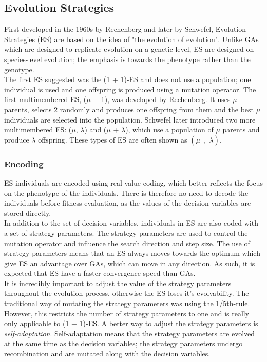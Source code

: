 \subsection{Evolution Strategies}
First developed in the 1960s by Rechenberg and later by Schwefel, Evolution Strategies (ES) are based on the idea of "the evolution of evolution"\cite{4-es}. Unlike GAs which are designed to replicate evolution on a genetic level, ES are designed on species-level evolution; the emphasis is towards the phenotype rather than the genotype.
\\The first ES suggested was the (1 + 1)-ES and does not use a population; one individual is used and one offspring is produced using a mutation operator\cite{4-es, es}. The first multimembered ES, ($\mu$ + 1), was developed by Rechenberg. It uses $\mu$ parents, selects 2 randomly and produces one offspring from them and the best $\mu$ individuals are selected into the population\cite{4-es, es}. Schwefel later introduced two more multimembered ES: ($\mu$, $\lambda$) and ($\mu$ + $\lambda$)\cite{es}, which use a population of $\mu$ parents and produce $\lambda$ offspring. These types of ES are often shown as $(\mu\;\overset{+}{,}\;\lambda)$.

\subsubsection{Encoding}
ES individuals are encoded using real value coding, which better reflects the focus on the phenotype of the individuals. There is therefore no need to decode the individuals before fitness evaluation, as the values of the decision variables are stored directly.
\\In addition to the set of decision variables, individuals in ES are also coded with a set of strategy parameters. The strategy parameters are used to control the mutation operator and influence the search direction and step size\cite{4-es, es}. The use of strategy parameters means that an ES always moves towards the optimum which give ES an advantage over GAs, which can move in any direction. As such, it is expected that ES have a faster convergence speed than GAs.
\\It is incredibly important to adjust the value of the strategy parameters throughout the evolution process, otherwise the ES loses it's evolvability\cite{es}. The traditional way of mutating the strategy parameters was using the 1/5th-rule\cite{es}. However, this restricts the number of strategy parameters to one and is really only applicable to (1 + 1)-ES. A better way to adjust the strategy parameters is \emph{self-adaptation}. Self-adaptation means that the strategy parameters are evolved at the same time as the decision variables; the strategy parameters undergo recombination and are mutated along with the decision variables.

